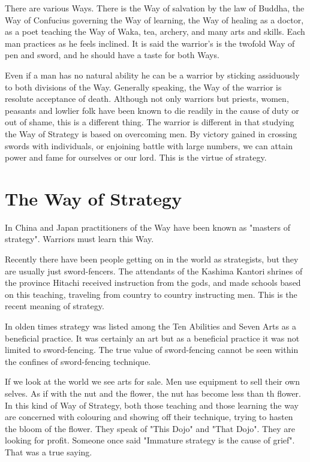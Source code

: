 \documentclass[12pt]{report}
\begin{document}
There are various Ways. There is the Way of salvation by the law of Buddha, the Way of Confucius governing the Way of learning, the Way of healing as a doctor, as a poet teaching the Way of Waka, tea, archery, and many arts and skills. Each man practices as he feels inclined. It is said the warrior's is the twofold Way of pen and sword, and he should have a taste for both Ways.

Even if a man has no natural ability he can be a warrior by sticking assiduously to both divisions of the Way. Generally speaking, the Way of the warrior is resolute acceptance of death. Although not only warriors but priests, women, peasants and lowlier folk have been known to die readily in the cause of duty or out of shame, this is a different thing. The warrior is different in that studying the Way of Strategy is based on overcoming men. By victory gained in crossing swords with individuals, or enjoining battle with large numbers, we can attain power and fame for ourselves or our lord. This is the virtue of strategy.
\section*{The Way of Strategy}
In China and Japan practitioners of the Way have been known as "masters of strategy". Warriors must learn this Way.

Recently there have been people getting on in the world as strategists, but they are usually just sword-fencers. The attendants of the Kashima Kantori shrines of the province Hitachi received instruction from the gods, and made schools based on this teaching, traveling from country to country instructing men. This is the recent meaning of strategy.

In olden times strategy was listed among the Ten Abilities and Seven Arts as a beneficial practice. It was certainly an art but as a beneficial practice it was not limited to sword-fencing. The true value of sword-fencing cannot be seen within the confines of sword-fencing technique.

If we look at the world we see arts for sale. Men use equipment to sell their own selves. As if with the nut and the flower, the nut has become less than th flower. In this kind of Way of Strategy, both those teaching and those learning the way are concerned with colouring and showing off their technique, trying to hasten the bloom of the flower. They speak of "This Dojo" and "That Dojo". They are looking for profit. Someone once said "Immature strategy is the cause of grief". That was a true saying.
\end{document}
